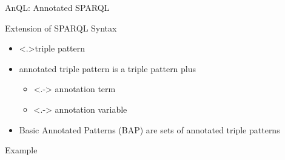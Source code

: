 \begin{frame}[fragile]{AnQL: Annotated SPARQL}

  \begin{block}{Extension of SPARQL Syntax}
    \begin{itemize}
    \item<+-> \alert<.>{triple pattern}
    \item<+-> \alert{annotated triple pattern} is a triple pattern plus 
      \begin{itemize}
      \item<.-> annotation term
      \item<.-> annotation variable
      \end{itemize}
    \item<+-> \alert{Basic Annotated Patterns} (BAP) are sets of annotated triple patterns

    \end{itemize}
  \end{block}

  \begin{block}{Example}
    \begin{small}
      \begin{semiverbatim}
 
\end{semiverbatim}
    \end{small}
  \end{block}


 
\end{frame}



